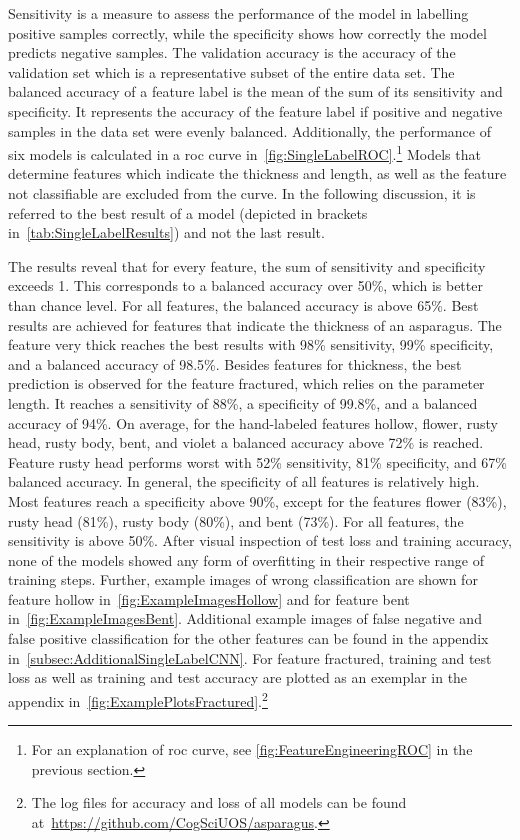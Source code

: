 Sensitivity is a measure to assess the performance of the model in labelling positive samples correctly, while the specificity shows how correctly the model predicts negative samples. The validation accuracy is the accuracy of the validation set which is a representative subset of the entire data set. The balanced accuracy of a feature label is the mean of the sum of its sensitivity and specificity. It represents the accuracy of the feature label if positive and negative samples in the data set were evenly balanced.
Additionally, the performance of six models is calculated in a \acrshort{roc} curve in~\autoref{fig:SingleLabelROC}.\footnote{For an explanation of \acrshort{roc} curve, see \autoref{fig:FeatureEngineeringROC} in the previous section.} Models that determine features which indicate the thickness and length, as well as the feature not classifiable are excluded from the curve.
In the following discussion, it is referred to the best result of a model (depicted in brackets in~\autoref{tab:SingleLabelResults}) and not the last result.

The results reveal that for every feature, the sum of sensitivity and specificity exceeds 1.  This corresponds to a balanced accuracy over 50\%, which is better than chance level. For all features, the balanced accuracy is above 65\%. Best results are achieved for features that indicate the thickness of an asparagus. The feature very thick reaches the best results with 98\% sensitivity, 99\% specificity, and a balanced accuracy of 98.5\%. Besides features for thickness, the best prediction is observed for the feature fractured, which relies on the parameter length. It reaches a sensitivity of 88\%, a specificity of 99.8\%, and a balanced accuracy of 94\%.
On average, for the hand-labeled features hollow, flower, rusty head, rusty body, bent, and violet a balanced accuracy above 72\% is reached. Feature rusty head performs worst with 52\% sensitivity, 81\% specificity, and 67\% balanced accuracy. In general, the specificity of all features is relatively high. Most features reach a specificity above 90\%, except for the features flower (83\%), rusty head (81\%), rusty body (80\%), and bent (73\%). For all features, the sensitivity is above 50\%. After visual inspection of test loss and training accuracy, none of the models showed any form of overfitting in their respective range of training steps.
Further, example images of wrong classification are shown for feature hollow in~\autoref{fig:ExampleImagesHollow} and for feature bent in~\autoref{fig:ExampleImagesBent}. Additional example images of false negative and false positive classification for the other features can be found in the appendix in~\autoref{subsec:AdditionalSingleLabelCNN}. For feature fractured, training and test loss as well as training and test accuracy are plotted as an exemplar in the appendix in~\autoref{fig:ExamplePlotsFractured}.\footnote{The log files for accuracy and loss of all models can be found at~\url{https://github.com/CogSciUOS/asparagus}.}
 
